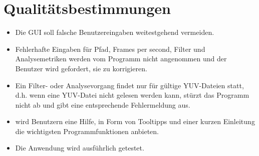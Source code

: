 \chapter{Qualitätsbestimmungen}

\begin{itemize}
\item Die GUI soll falsche Benutzereingaben weitestgehend vermeiden.
\item Fehlerhafte Eingaben für Pfad, Frames per second, Filter und Analysemetriken werden vom Programm nicht angenommen und der Benutzer wird gefordert, sie zu korrigieren.
\item Ein Filter- oder Analysevorgang findet nur für gültige YUV-Dateien statt, d.h. wenn eine YUV-Datei nicht gelesen werden kann, stürzt das Programm nicht ab und gibt eine entsprechende Fehlermeldung aus.
\item \projektTitel wird Benutzern eine Hilfe, in Form von Tooltipps und einer kurzen Einleitung die wichtigsten Programmfunktionen anbieten.
\item Die Anwendung wird ausführlich getestet.
\end{itemize}